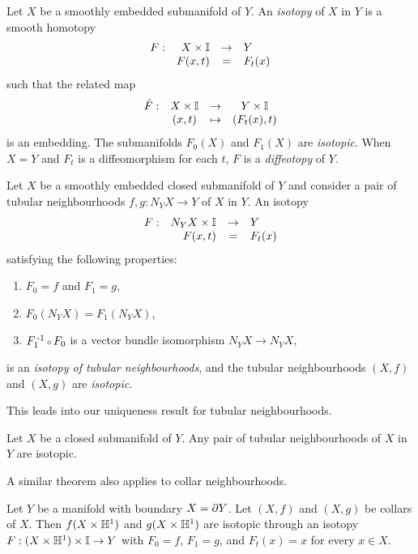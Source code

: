 \begin{defn}[Isotopy]
	\label{def:isotopy}
	Let $X$ be a smoothly embedded submanifold of $Y$.
	An \emph{isotopy} of $X$ in $Y$ is a smooth homotopy
	\[
		\begin{array}{crcl}
			F: & X\times \mathbb{I} & \to & Y \\
			   & F(x,t) & = & F_t(x)
		\end{array}
	\]
	such that the related map
	\[
		\begin{array}{cccc}
			\hat{F}: & X\times\mathbb{I} & \to & Y\times\mathbb{I} \\
					 & (x,t) & \mapsto & (F_t(x),t)
		\end{array}
	\]
	is an embedding.
	The submanifolds $F_0(X)$ and $F_1(X)$ are \emph{isotopic}.
	When $X=Y$ and $F_t$ is a diffeomorphism for each $t$, $F$ is a \emph{diffeotopy} of $Y$.
	
	Let $X$ be a smoothly embedded closed submanifold of $Y$ and consider a pair of tubular neighbourhoods $f,g:N_Y X\to Y$ of $X$ in $Y$.
	An isotopy
	\[
		\begin{array}{crcl}
			F: & N_Y X\times\mathbb{I} & \to & Y \\
			   & F(x,t) & = & F_t(x)
		\end{array}
	\]
	satisfying the following properties:
	\begin{enumerate}
		\item $F_0=f$ and $F_1=g$,
		\item $F_0(N_Y X)=F_1(N_Y X)$,
		\item $F_1\inv\comp F_0$ is a vector bundle isomorphism $N_Y X\to N_Y X$,
	\end{enumerate}
	 is an \emph{isotopy of tubular neighbourhoods}, and the tubular neighbourhoods $(X,f)$ and $(X,g)$ are \emph{isotopic}.
\end{defn}

This leads into our uniqueness result for tubular neighbourhoods.

\begin{theorem}
	\label{prop:uniquenesstubularneighbourhood}
	Let $X$ be a closed submanifold of $Y$.
	Any pair of tubular neighbourhoods of $X$ in $Y$ are isotopic.
\end{theorem}

A similar theorem also applies to collar neighbourhoods.

\begin{theorem}
	Let $Y$ be a manifold with boundary $X = \partial Y$.
	Let $(X,f)$ and $(X,g)$ be collars of $X$.
	Then $f(X\times\mathbb{H}^1)$ and $g(X\times\mathbb{H}^1)$ are isotopic through an isotopy $F:(X\times\mathbb{H}^1)\times\mathbb{I}\to Y$ with $F_0=f$, $F_1=g$, and $F_t(x)=x$ for every $x\in X$.	
\end{theorem}

